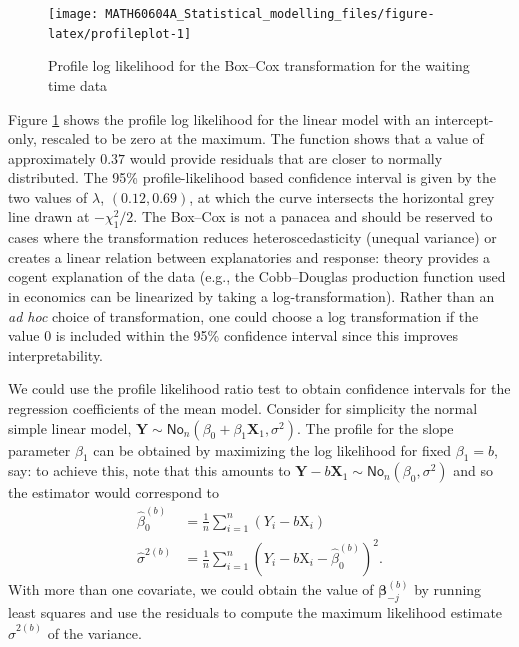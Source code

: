 \documentclass[
  11pt,
  letterpaper,
]{book}
\theoremstyle{definition}
\theoremstyle{definition}
\theoremstyle{definition}
\theoremstyle{definition}
\theoremstyle{remark}
\begin{document}
\begin{figure}

{\centering \texttt{[image: MATH60604A\_Statistical\_modelling\_files/figure-latex/profileplot-1]} 

}

\caption{Profile log likelihood for the Box--Cox transformation for the waiting time data}\label{fig:profileplot}
\end{figure}

Figure \ref{fig:profileplot} shows the profile log likelihood for the linear model with an intercept-only, rescaled to be zero at the maximum. The function shows that a value of approximately \(0.37\) would provide residuals that are closer to normally distributed. The 95\% profile-likelihood based confidence interval is given by the two values of \(\lambda\), \((0.12, 0.69)\), at which the curve intersects the horizontal grey line drawn at \(-\chi^2_1/2\). The Box--Cox is not a panacea and should be reserved to cases where the transformation reduces heteroscedasticity (unequal variance) or creates a linear relation between explanatories and response: theory provides a cogent explanation of the data (e.g., the Cobb--Douglas production function used in economics can be linearized by taking a log-transformation). Rather than an \emph{ad hoc} choice of transformation, one could choose a log transformation if the value \(0\) is included within the 95\% confidence interval since this improves interpretability.

We could use the profile likelihood ratio test to obtain confidence intervals for the regression coefficients of the mean model. Consider for simplicity the normal simple linear model, \(\boldsymbol{Y} \sim \mathsf{No}_n(\beta_0 + \beta_1\mathbf{X}_1, \sigma^2)\). The profile for the slope parameter \(\beta_1\) can be obtained by maximizing the log likelihood for fixed \(\beta_1=b\), say: to achieve this, note that this amounts to \(\boldsymbol{Y}-b\mathbf{X}_1 \sim \mathsf{No}_n(\beta_0, \sigma^2)\) and so the estimator would correspond to
\begin{align*}
\widehat{\beta}_{0}^{(b)}&=\frac{1}{n} \sum_{i=1}^n (Y_i-b\mathrm{X}_i)\\
\widehat{\sigma}^{2(b)} &= \frac{1}{n}\sum_{i=1}^n \left(Y_i-b\mathrm{X}_i-\widehat{\beta}_{0}^{(b)}\right)^2.
\end{align*}
With more than one covariate, we could obtain the value of \(\boldsymbol{\beta}_{-j}^{(b)}\) by running least squares and use the residuals to compute the maximum likelihood estimate \(\widehat{\sigma}^{2(b)}\) of the variance.
\end{document}
